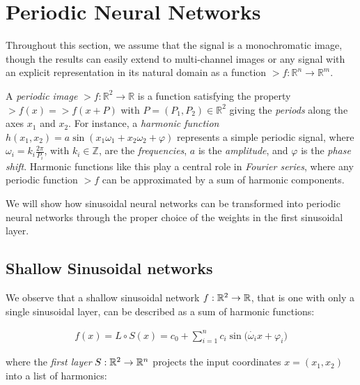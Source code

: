 

\section{Periodic Neural Networks}

Throughout this section, we assume that the signal is a monochromatic image, though the results can easily extend to multi-channel images or any signal with an explicit representation in its natural domain as a function \( \gt{f}: \mathbb{R}^n \to \mathbb{R}^m \).

A \textit{periodic image} $\gt{f}:\mathbb{R}^2\to \mathbb{R}$ is a function satisfying the property $\gt{f}(x) \!=\! \gt{f}(x + P)$ with $P=(P_1, P_2)\in \mathbb{R}^2$ giving the \textit{periods} along the axes $x_1$ and $x_2$.
For instance, a \textit{harmonic function} $h(x_1, x_2)=a\sin(x_1\omega_1+x_2\omega_2+ \varphi)$ represents a simple periodic signal, where $\omega_i\!=\!k_i\frac{2\pi}{P_i}$, with \( k_i \in \mathbb{Z} \), are the \textit{frequencies}, $a$ is the \textit{amplitude}, and $\varphi$ is the \textit{phase shift}.
Harmonic functions like this play a central role in \textit{Fourier series}, where any periodic function $\gt{f}$ can be approximated by a sum of harmonic components.

We will show how sinusoidal neural networks can be transformed into periodic neural networks through the proper choice of the weights in the first sinusoidal layer.


\subsection{Shallow Sinusoidal networks}

We observe that a shallow sinusoidal network $f:\mathbb{R}^2\to \mathbb{R}$, that is one with only a single sinusoidal layer, can be described as a sum of harmonic functions:

\begin{align}\label{e-fourier_series}
    f(x) = L\circ S(x) =  c_0 + \sum_{i=1}^{n} c_i  \sin\Big(\dot{\omega_i}{ x}+ \varphi_i\Big)
\end{align}

where the \textit{first layer} $S:\mathbb{R}^2\to \mathbb{R}^{n}$ projects the input coordinates $x=(x_1,x_2)$ into a list of harmonics:

